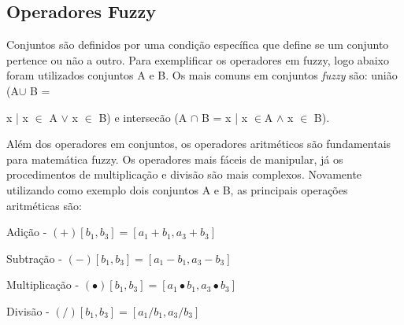 \documentclass[12pt]{article}
\begin{document}
\subsection{Operadores Fuzzy}
Conjuntos são definidos por uma condição específica que define se um conjunto pertence ou não a outro. Para exemplificar os operadores em fuzzy, logo abaixo foram utilizados conjuntos A e B.
Os mais comuns em conjuntos \textit{fuzzy} são: união 
(A\begin{math} \cup \end{math} B ={ x | x \begin{math}\in \end{math} A \begin{math}\vee \end{math} x \begin{math}\in \end{math} B) e intersecão (A \begin{math} \cap \end{math} B = 
x | x \begin{math}\in \end{math}A \begin{math}\wedge \end{math} x \begin{math}\in \end{math} B).  

Além dos operadores em conjuntos, os operadores aritméticos são fundamentais para matemática fuzzy. Os operadores mais fáceis de manipular, já os procedimentos de multiplicação e divisão são mais complexos. Novamente utilizando como exemplo dois conjuntos A e B, as principais operações aritméticas são:

Adição - 
\begin{math} [{a_1},{a_3}] (+) [{b_1},{b_3}]= [{a_1 + b_1,a_3 + b_3}]  \end{math}

Subtração - \begin{math} [{a_1},{a_3}] (-) [{b_1},{b_3}] = [{a_1 - b_1,a_3 - b_3}]  \end{math}

Multiplicação - 
\begin{math} [{a_1},{a_3}] (\bullet) [{b_1},{b_3}]= [{a_1 \bullet b_1,a_3 \bullet b_3}]  \end{math}

Divisão - 
\begin{math} [{a_1},{a_3}] (/) [{b_1},{b_3}]= [{a_1 / b_1,a_3 / b_3}]  \end{math}



}
\end{document}
